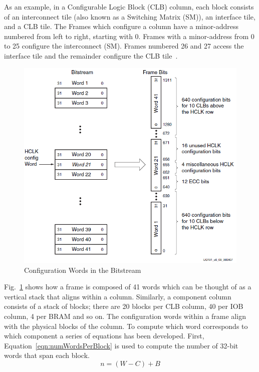 \documentclass[journal, hidelinks]{IEEEtran}
\begin{document}
As an example, in a Configurable Logic Block (CLB) column, each block consists of an interconnect tile (also known as a Switching Matrix (SM)), an interface tile, and a CLB tile.
The Frames which configure a column have a minor-address numbered from left to right, starting with 0.
Frames with a minor-address from 0 to 25 configure the interconnect (SM).
Frames numbered 26 and 27 access the interface tile and the remainder configure the CLB tile~\cite{virtex5ConfigGuide}.
\begin{figure}[h]
	\centering
	\includegraphics[width=0.96\linewidth]{Figures/frameTileMap}
	\caption[Configuration Words in the Bitstream~\cite{virtex5ConfigGuide}]{Configuration Words in the Bitstream~\cite{virtex5ConfigGuide}}
	\label{fig:frameTileMap}
\end{figure}

Fig.~\ref{fig:frameTileMap} shows how a frame is composed of 41 words which can be thought of as a vertical stack that aligns within a column.
Similarly, a component column consists of a stack of blocks; there are 20 blocks per CLB column, 40 per IOB column, 4 per BRAM and so on.
The configuration words within a frame align with the physical blocks of the column.
To compute which word corresponds to which component a series of equations has been developed.
First, Equation~\ref{eqn:numWordsPerBlock} is used to compute the number of 32-bit words that span each block.
\begin{equation} \label{eqn:numWordsPerBlock}
n = (W - C) + B
\end{equation}
\end{document}
